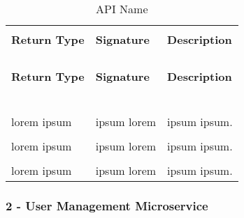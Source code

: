 \begin{longtable}{p{}p{}p{}}
    \caption{API Name}
    \vspace{0.5em}\\
    \hline
    \vspace{0.5em}\\
    \textbf{Return Type} & \textbf{Signature} & \textbf{Description} \\
    \vspace{0.5em}\\
    \hline
    \vspace{0.5em}\\
    \endfirsthead
    \vspace{0.5em}\\
    \hline
    \vspace{0.5em}\\
    \textbf{Return Type} & \textbf{Signature} & \textbf{Description} \\
    \vspace{0.5em}\\
    \hline
    \vspace{0.5em}\\
    \endhead
    
    \vspace{0.5em}\\
    \hline
    \vspace{0.5em}\\
    \endfoot
    
    \vspace{0.5em}\\
    \hline
    \vspace{0.5em}\\
    \endlastfoot
    
    lorem ipsum &
    ipsum lorem &
    ipsum ipsum. \\
    \vspace{0.5em}\\
    lorem ipsum &
    ipsum lorem &
    ipsum ipsum. \\
    \vspace{0.5em}\\
    lorem ipsum &
    ipsum lorem &
    ipsum ipsum. \\

\end{longtable}

\subsubsection{2 - User Management Microservice}

